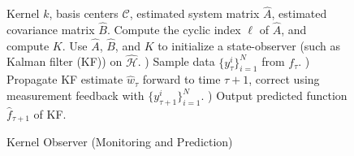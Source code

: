 \documentclass[letterpaper,12pt,peerreviewca,draftcls]{IEEEtran}
\newcommand{\estweight}{\widehat{w}}
\newcommand{\fspace}{\mathcal{H}}
\newcommand{\kernel}{k}
\newcommand{\empK}{\ensuremath{K}}
\newcommand{\nsamp}{N}
\newcommand{\shCent}{\mathcal{C}}
\newcommand{\fspaceApprox}{\widehat{\fspace}}
\newcommand{\minmeas}{\ell}
\newcommand{\dualop}{A}
\newcommand{\dualopApprox}{\widehat{\dualop}}
\newcommand{\tindex}{\tau}
\newcommand{\estcontrolop}{\widehat{B}}
\begin{document}
\begin{figure}[t!]
	\begin{algorithm}[H]
		\caption{Kernel Observer (Monitoring and Prediction)}
		\label{alg:egp_inf}
		\begin{algorithmic}
				 Kernel $\kernel$, basis centers $\shCent$, 
				estimated system matrix $\dualopApprox$, estimated covariance matrix $\estcontrolop$.
				 Compute the cyclic index $\minmeas$ of $\dualopApprox$, and compute $\empK$.
				 Use $\dualopApprox$, $\estcontrolop$, and $\empK$ to initialize a state-observer (such as Kalman filter (KF)) on $\fspaceApprox$.
				) Sample data $\{y^i_{\tindex}\}_{i=1}^{\nsamp}$ from $f_{\tindex}$.
				) Propagate KF estimate $\estweight_{\tindex}$ 
				forward to time $\tindex+1$, correct using measurement feedback with $\{y^i_{\tindex+1}\}_{i=1}^{\nsamp}$. 
				) Output predicted function $\widehat{f}_{\tindex+1}$ of KF.
				\ENDWHILE   
		\end{algorithmic}
	\end{algorithm}
	\vspace{-0.2in}
\end{figure}
\end{document}
